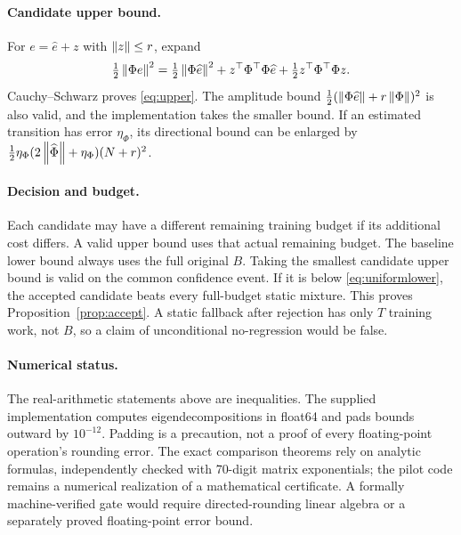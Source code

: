 \paragraph{Candidate upper bound.}
For $e=\widehat e+z$ with $\left\lVert z\right\rVert\le r$, expand
\[
 \tfrac12\left\lVert\Phi e\right\rVert^2
 =\tfrac12\left\lVert\Phi\widehat e\right\rVert^2+
 z^\top\Phi^\top\Phi\widehat e+\tfrac12z^\top\Phi^\top\Phi z.
\]
Cauchy--Schwarz proves \eqref{eq:upper}. The amplitude bound $\frac12(\left\lVert\Phi\widehat e\right\rVert+r\left\lVert\Phi\right\rVert)^2$ is also valid, and the implementation takes the smaller bound. If an estimated transition has error $\eta_\Phi$, its directional bound can be enlarged by
$\frac12\eta_\Phi(2\left\lVert\widehat\Phi\right\rVert+\eta_\Phi)(N+r)^2$.

\paragraph{Decision and budget.}
Each candidate may have a different remaining training budget if its additional cost differs. A valid upper bound uses that actual remaining budget. The baseline lower bound always uses the full original $B$. Taking the smallest candidate upper bound is valid on the common confidence event. If it is below \eqref{eq:uniformlower}, the accepted candidate beats every full-budget static mixture. This proves Proposition~\ref{prop:accept}. A static fallback after rejection has only $T$ training work, not $B$, so a claim of unconditional no-regression would be false.

\paragraph{Numerical status.}
The real-arithmetic statements above are inequalities. The supplied implementation computes eigendecompositions in float64 and pads bounds outward by $10^{-12}$. Padding is a precaution, not a proof of every floating-point operation's rounding error. The exact comparison theorems rely on analytic formulas, independently checked with 70-digit matrix exponentials; the pilot code remains a numerical realization of a mathematical certificate. A formally machine-verified gate would require directed-rounding linear algebra or a separately proved floating-point error bound.
